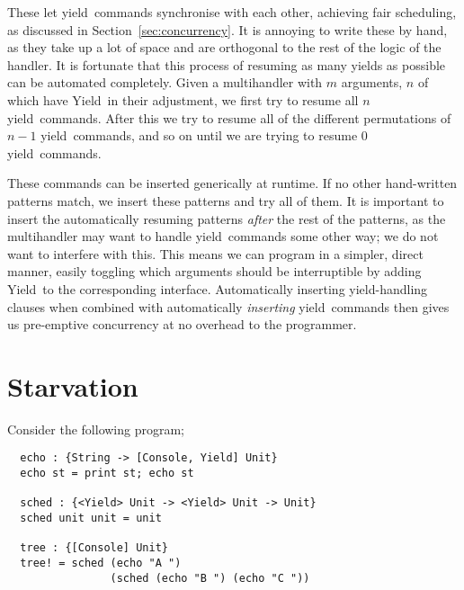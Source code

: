\documentclass[msc,deptreport,cs]{infthesis} %
\newcommand\yield{\textsf{yield}\xspace}
\newcommand\Yield{\textsf{Yield}\xspace}
\begin{document}
These let \yield~commands synchronise with each other, achieving fair
scheduling, as discussed in Section~\ref{sec:concurrency}. It is annoying to
write these by hand, as they take up a lot of space and are orthogonal to the
rest of the logic of the handler. It is fortunate that this process of resuming
as many yields as possible can be automated completely. Given a multihandler
with $m$ arguments, $n$ of which have \Yield~in their adjustment, we first try
to resume all $n$ \yield~commands. After this we try to resume all of the
different permutations of $n-1$ \yield~commands, and so on until we are trying
to resume 0 \yield~commands.
%




These commands can be inserted generically at runtime. If no other hand-written
patterns match, we insert these patterns and try all of them. It is important to
insert the automatically resuming patterns \emph{after} the rest of the
patterns, as the multihandler may want to handle \yield~commands some other way;
we do not want to interfere with this. This means we can program in a simpler,
direct manner, easily toggling which arguments should be interruptible by adding
\Yield~to the corresponding interface. Automatically inserting \yield-handling
clauses when combined with automatically \emph{inserting} \yield~commands then
gives us pre-emptive concurrency at no overhead to the programmer.

\section{Starvation}
\label{sec:starvation}

Consider the following program;

\begin{lstlisting}
  echo : {String -> [Console, Yield] Unit}
  echo st = print st; echo st

  sched : {<Yield> Unit -> <Yield> Unit -> Unit}
  sched unit unit = unit

  tree : {[Console] Unit}
  tree! = sched (echo "A ")
                (sched (echo "B ") (echo "C "))
\end{lstlisting}
\end{document}

